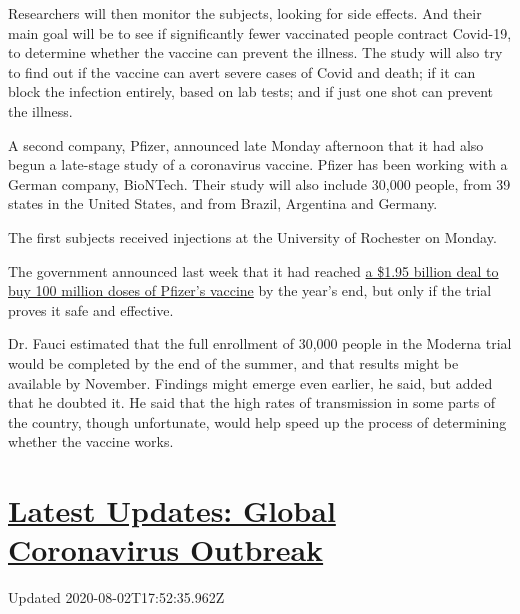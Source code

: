 Researchers will then monitor the subjects, looking for side effects.
And their main goal will be to see if significantly fewer vaccinated
people contract Covid-19, to determine whether the vaccine can prevent
the illness. The study will also try to find out if the vaccine can
avert severe cases of Covid and death; if it can block the infection
entirely, based on lab tests; and if just one shot can prevent the
illness.

A second company, Pfizer, announced late Monday afternoon that it had
also begun a late-stage study of a coronavirus vaccine. Pfizer has been
working with a German company, BioNTech. Their study will also include
30,000 people, from 39 states in the United States, and from Brazil,
Argentina and Germany.

The first subjects received injections at the University of Rochester on
Monday.

The government announced last week that it had reached
\href{https://www.nytimes.com/2020/07/22/us/politics/pfizer-coronavirus-vaccine.html}{a
\$1.95 billion deal to buy 100 million doses of Pfizer's vaccine} by the
year's end, but only if the trial proves it safe and effective.

Dr. Fauci estimated that the full enrollment of 30,000 people in the
Moderna trial would be completed by the end of the summer, and that
results might be available by November. Findings might emerge even
earlier, he said, but added that he doubted it. He said that the high
rates of transmission in some parts of the country, though unfortunate,
would help speed up the process of determining whether the vaccine
works.

\hypertarget{latest-updates-global-coronavirus-outbreak}{%
\section{\texorpdfstring{\href{https://www.nytimes.com/2020/08/01/world/coronavirus-covid-19.html?action=click\&pgtype=Article\&state=default\&region=MAIN_CONTENT_1\&context=storylines_live_updates}{Latest
Updates: Global Coronavirus
Outbreak}}{Latest Updates: Global Coronavirus Outbreak}}\label{latest-updates-global-coronavirus-outbreak}}

Updated 2020-08-02T17:52:35.962Z

